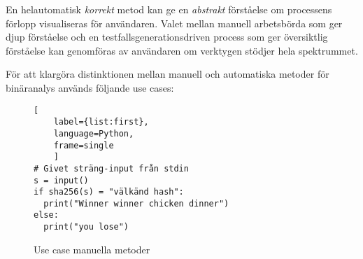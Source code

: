 

En helautomatisk \textit{korrekt} metod kan ge en \textit{abstrakt} förståelse
om processens förlopp visualiseras för användaren. Valet mellan manuell
arbetsbörda som ger djup förståelse och en testfallsgenerationsdriven process
som ger översiktlig förståelse kan genomföras av användaren om verktygen stödjer
hela spektrummet.

För att klargöra distinktionen mellan manuell och automatiska metoder för
binäranalys används följande use cases:

\begin{figure}
\begin{lstlisting}[
    label={list:first},
    language=Python,
    frame=single
    ]
# Givet sträng-input från stdin
s = input()
if sha256(s) = "välkänd hash":
  print("Winner winner chicken dinner")
else:
  print("you lose")
\end{lstlisting}
\caption{Use case manuella metoder}
\end{figure}

